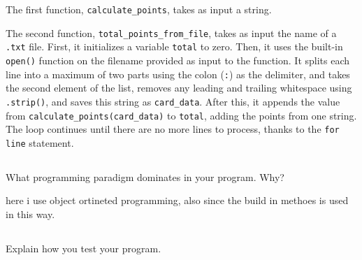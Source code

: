 \documentclass{article}
\begin{document}
The first function, \texttt{calculate\_points}, takes as input a string.

The second function, \texttt{total\_points\_from\_file}, takes as input the name of a \texttt{.txt} file. First, it initializes a variable \texttt{total} to zero. Then, it uses the built-in \texttt{open()} function on the filename provided as input to the function. It splits each line into a maximum of two parts using the colon (\texttt{:}) as the delimiter, and takes the second element of the list, removes any leading and trailing whitespace using \texttt{.strip()}, and saves this string as \texttt{card\_data}. After this, it appends the value from \texttt{calculate\_points(card\_data)} to \texttt{total}, adding the points from one string. The loop continues until there are no more lines to process, thanks to the \texttt{for line} statement.



\subsection{}

What programming paradigm dominates in your program. Why?

here i use object ortineted programming, also since the build in methoes is used in this way.


\subsection{}


Explain how you test your program.


\section{}




\subsection{}
\end{document}
